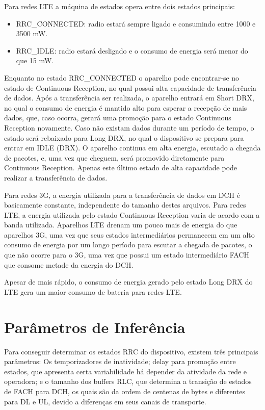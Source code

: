\documentclass{article}
\begin{document}
Para redes LTE a máquina de estados opera entre dois estados principais: 
\begin{itemize}
\item RRC\_CONNECTED: radio estará sempre ligado e consumindo entre 1000 e 3500 mW.
\item RRC\_IDLE: radio estará desligado e o consumo de energia será menor do que 15 mW.
\end{itemize}

Enquanto no estado RRC\_CONNECTED o aparelho pode encontrar-se no estado de Continuous Reception, no qual possui alta
capacidade de transferência de dados. Após a transferência ser realizada, o aparelho entrará em Short DRX, no qual o
consumo de energia é mantido alto para esperar a recepção de mais dados, que, caso ocorra, gerará uma promoção para o
estado Continuous Reception novamente. Caso não existam dados durante um período de tempo, o estado será rebaixado para
Long DRX, no qual o dispositivo se prepara para entrar em IDLE (DRX). O aparelho continua em alta energia, escutado a
chegada de pacotes, e, uma vez que cheguem, será promovido diretamente para Continuous Reception. Apenas este último
estado de alta capacidade pode realizar a transferência de dados.


Para redes 3G, a energia utilizada para a transferência de dados em DCH é basicamente constante, independente do
tamanho destes arquivos. Para redes LTE, a energia utilizada pelo estado Continuous Reception varia de acordo com a
banda utilizada. Aparelhos LTE drenam um pouco mais de energia do que aparelhos 3G, uma vez que seus estados
intermediários permanecem em um alto consumo de energia por um longo período para escutar a chegada de pacotes, o que
não ocorre para o 3G, uma vez que possui um estado intermediário FACH que consome metade da energia do DCH.

Apesar de mais rápido, o consumo de energia gerado pelo estado Long DRX do LTE gera um maior consumo de bateria para
redes LTE.

\section{Parâmetros de Inferência}

Para conseguir determinar os estados RRC do dispositivo, existem três principais parâmetros: Os temporizadores de
inatividade; delay para promoção entre estados, que apresenta certa variabilidade há depender da atividade da rede e
operadora; e o tamanho dos buffers RLC, que determina a transição de estados de FACH para DCH, os quais são da ordem de
centenas de bytes e diferentes
para DL e UL, devido a diferenças em seus canais de transporte.
\end{document}

